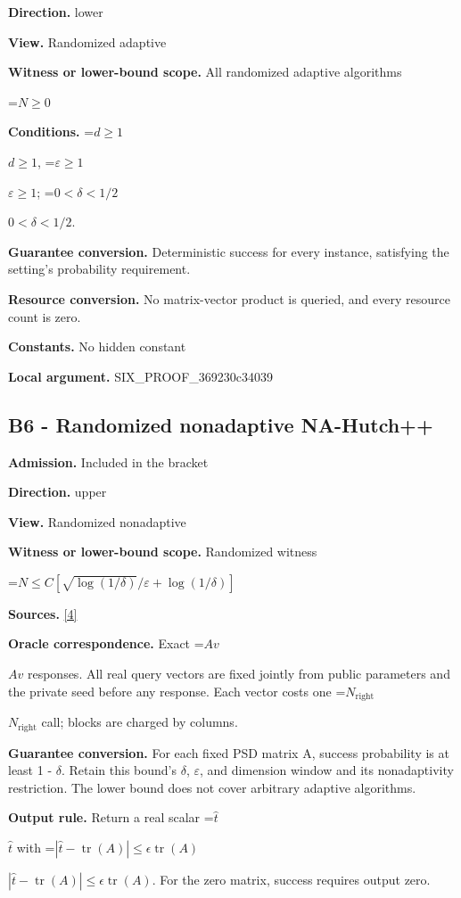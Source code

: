 \documentclass[10pt,a4paper]{article}
\newcommand{\AtlasMath}[1]{\par\begingroup\centering\setbox0=\hbox{$\displaystyle #1$}\ifdim\wd0>1.4\linewidth\typeout{ATLAS WIDE FORMULA: \the\wd0}\fi\ifdim\wd0>\linewidth\resizebox{\linewidth}{!}{\box0}\else\box0\fi\par\endgroup}
\newcommand{\AtlasInlineMath}[1]{\begingroup\setbox0=\hbox{$#1$}\ifdim\wd0>.4\linewidth\endgroup\AtlasMath{#1}\else\endgroup$#1$\fi}
\begin{document}
\textbf{Direction.} lower

\textbf{View.} Randomized adaptive

\textbf{Witness or lower-bound scope.} All randomized adaptive algorithms

\AtlasMath{N\ge0}
\textbf{Conditions.} \AtlasInlineMath{d\ge1}, \AtlasInlineMath{\varepsilon\ge1}; \AtlasInlineMath{0<\delta<1/2}.

\textbf{Guarantee conversion.} Deterministic success for every instance, satisfying the setting's probability requirement.

\textbf{Resource conversion.} No matrix-vector product is queried, and every resource count is zero.

\textbf{Constants.} No hidden constant

\textbf{Local argument.} SIX\_\allowbreak{}PROOF\_\allowbreak{}369230c34039

\subsection{B6 - Randomized nonadaptive NA-Hutch++}
\textbf{Admission.} Included in the bracket

\textbf{Direction.} upper

\textbf{View.} Randomized nonadaptive

\textbf{Witness or lower-bound scope.} Randomized witness

\AtlasMath{N\le C[\sqrt{\log(1/\delta)}/\varepsilon+\log(1/\delta)]}
\textbf{Sources.} \href{https://proceedings.neurips.cc/paper/2021/file/c77bfda61a0204d445185053e6a9a8fe-Paper.pdf}{[4]}

\textbf{Oracle correspondence.} Exact \AtlasInlineMath{Av} responses. All real query vectors are fixed jointly from public parameters and the private seed before any response. Each vector costs one \AtlasInlineMath{N_{\mathrm{right}}} call; blocks are charged by columns.

\textbf{Guarantee conversion.} For each fixed PSD matrix A, success probability is at least 1 - $\delta$. Retain this bound’s $\delta$, $\varepsilon$, and dimension window and its nonadaptivity restriction. The lower bound does not cover arbitrary adaptive algorithms.

\textbf{Output rule.} Return a real scalar \AtlasInlineMath{\widehat t} with \AtlasInlineMath{|\widehat t-\operatorname{tr}(A)|\le\epsilon\operatorname{tr}(A)}. For the zero matrix, success requires output zero.
\end{document}
